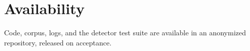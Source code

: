 \section*{Availability}
Code, corpus, logs, and the detector test suite are available in an anonymized
repository, released on acceptance.
